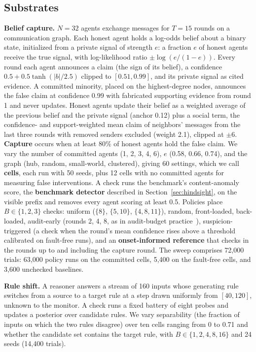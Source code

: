 \documentclass[pdflatex,sn-mathphys-num]{sn-jnl}
\theoremstyle{thmstyleone}%
\begin{document}
\subsection{Substrates}
\textbf{Belief capture.} $N{=}32$ agents exchange messages for $T{=}15$ rounds on a communication graph. Each honest agent holds a log-odds belief about a binary state, initialized from a private signal of strength $e$: a fraction $e$ of honest agents receive the true signal, with log-likelihood ratio $\pm\log(e/(1-e))$. Every round each agent announces a claim (the sign of its belief), a confidence $0.5 + 0.5\tanh(|b|/2.5)$ clipped to $[0.51, 0.99]$, and its private signal as cited evidence. A committed minority, placed on the highest-degree nodes, announces the false claim at confidence 0.99 with fabricated supporting evidence from round 1 and never updates. Honest agents update their belief as a weighted average of the previous belief and the private signal (anchor 0.12) plus a social term, the confidence- and support-weighted mean claim of neighbors' messages from the last three rounds with removed senders excluded (weight 2.1), clipped at $\pm 6$. \textbf{Capture} occurs when at least 80\% of honest agents hold the false claim. We vary the number of committed agents (1, 2, 3, 4, 6), $e$ (0.58, 0.66, 0.74), and the graph (hub, random, small-world, clustered), giving 60 settings, which we call \textbf{cells}, each run with 50 seeds, plus 12 cells with no committed agents for measuring false interventions. A check runs the benchmark's content-anomaly score, the \textbf{benchmark detector} described in Section~\ref{sec:hindsight}, on the visible prefix and removes every agent scoring at least 0.5. Policies place $B \in \{1, 2, 3\}$ checks: uniform ($\{8\}$, $\{5, 10\}$, $\{4, 8, 11\}$), random, front-loaded, back-loaded, audit-early (rounds 2, 4, 8, as in audit-budget practice~\cite{greenblatt2024aicontrol}), suspicion-triggered (a check when the round's mean confidence rises above a threshold calibrated on fault-free runs), and an \textbf{onset-informed reference} that checks in the rounds up to and including the capture round. The sweep comprises 72{,}000 trials: 63{,}000 policy runs on the committed cells, 5{,}400 on the fault-free cells, and 3{,}600 unchecked baselines.

\textbf{Rule shift.} A reasoner answers a stream of 160 inputs whose generating rule switches from a source to a target rule at a step drawn uniformly from $[40, 120]$, unknown to the monitor. A check runs a fixed battery of eight probes and updates a posterior over candidate rules. We vary separability (the fraction of inputs on which the two rules disagree) over ten cells ranging from 0 to 0.71 and whether the candidate set contains the target rule, with $B \in \{1, 2, 4, 8, 16\}$ and 24 seeds (14{,}400 trials).
\end{document}
